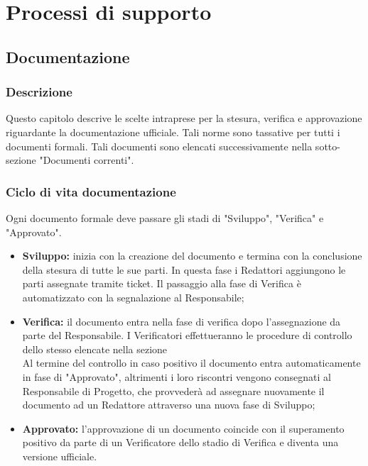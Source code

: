 \documentclass[NormeDiProgetto.tex]{subfiles}
\begin{document}
	
	
	\chapter{Processi di supporto}
	
	\section{Documentazione}
	\subsection{Descrizione}
	Questo capitolo descrive le scelte intraprese per la
	stesura, verifica e approvazione riguardante la documentazione ufficiale.
	Tali norme sono tassative per tutti i documenti formali.
	Tali documenti sono elencati successivamente nella sotto-sezione "Documenti correnti". %
	
	\subsection{Ciclo di vita documentazione}
	Ogni documento formale deve passare gli stadi di "Sviluppo", "Verifica" e "Approvato".
	\begin{itemize}
		\item \textbf{Sviluppo:} inizia con la creazione del documento e termina con la conclusione della stesura di tutte le sue parti. In questa fase i Redattori aggiungono le parti assegnate tramite ticket.
		Il passaggio alla fase di Verifica è automatizzato con la segnalazione al Responsabile;
		
		\item \textbf{Verifica:} il documento entra nella fase di verifica dopo l'assegnazione da parte del Responsabile.
		I Verificatori effettueranno le procedure di controllo dello stesso elencate nella sezione %
		\\
		Al termine del controllo in caso positivo il documento entra automaticamente in fase di "Approvato", altrimenti i loro riscontri vengono consegnati al Responsabile di Progetto, che provvederà ad assegnare nuovamente il documento ad un Redattore attraverso una nuova fase di Sviluppo;
		
		\item \textbf{Approvato:} l'approvazione di un documento coincide con il superamento positivo da parte di un Verificatore dello stadio di Verifica e diventa una versione ufficiale.
	\end{itemize}
	
\end{document}
